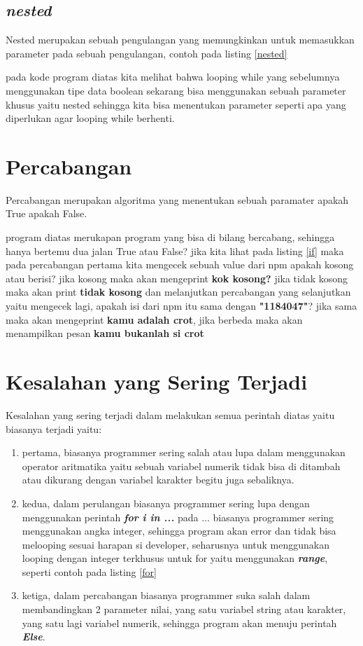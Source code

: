 \subsection{\textit{nested}}
Nested merupakan sebuah pengulangan yang memungkinkan untuk memasukkan parameter pada sebuah pengulangan, contoh pada listing \ref{nested}



pada kode program diatas kita melihat bahwa looping while yang sebelumnya menggunakan tipe data boolean sekarang bisa menggunakan sebuah parameter khusus yaitu nested sehingga kita bisa menentukan parameter seperti apa yang diperlukan agar looping while berhenti.

\section{Percabangan}
Percabangan merupakan algoritma yang menentukan sebuah paramater apakah True apakah False.



program diatas merukapan program yang bisa di bilang bercabang, sehingga hanya bertemu dua jalan True atau False? jika kita lihat pada listing \ref{if} maka pada percabangan pertama kita mengecek sebuah value dari npm apakah kosong atau berisi? jika kosong maka akan mengeprint \textbf{kok kosong?} jika tidak kosong maka akan print \textbf{tidak kosong} dan melanjutkan percabangan yang selanjutkan yaitu mengecek lagi, apakah isi dari npm itu sama dengan \textbf{"1184047"}? jika sama maka akan mengeprint \textbf{kamu adalah crot}, jika berbeda maka akan menampilkan pesan \textbf{kamu bukanlah si crot}

\section{Kesalahan yang Sering Terjadi}
Kesalahan yang sering terjadi dalam melakukan semua perintah diatas yaitu biasanya terjadi yaitu:
\begin{enumerate}
\item pertama, biasanya programmer sering salah atau lupa dalam menggunakan operator aritmatika yaitu sebuah variabel numerik tidak bisa di ditambah atau dikurang dengan variabel karakter begitu juga sebaliknya.
\item kedua, dalam perulangan biasanya programmer sering lupa dengan menggunakan perintah \textbf{\textit{for i in ...}} pada ... biasanya programmer sering menggunakan angka integer, sehingga program akan error dan tidak bisa melooping sesuai harapan si developer, seharusnya untuk menggunakan looping dengan integer terkhusus untuk for yaitu menggunakan \textbf{\textit{range}}, seperti contoh pada listing \ref{for}
\item ketiga, dalam percabangan biasanya programmer suka salah dalam membandingkan 2 parameter nilai, yang satu variabel string atau karakter, yang satu lagi variabel numerik, sehingga program akan menuju perintah \textbf{\textit{Else}}.
\end{enumerate}

